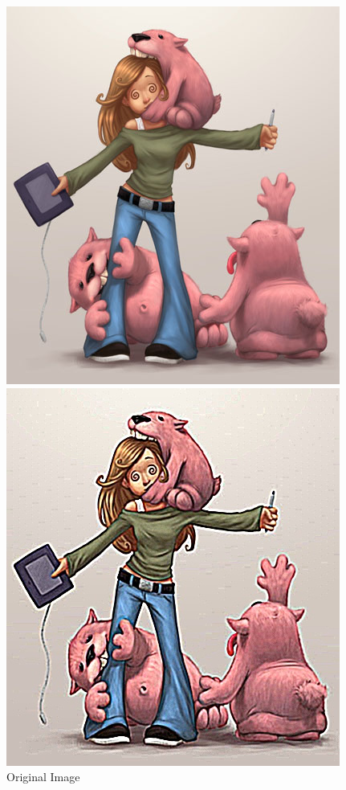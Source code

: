 \documentclass[10pt,twocolumn]{article}
\begin{document}
\begin{figure}
\centering
\begin{minipage}{0.15\textwidth}
\centering \includegraphics[width=\textwidth]{test2.jpg}
\caption{Original Image}
\end{minipage}
\begin{minipage}{0.15\textwidth}
\centering \includegraphics[width=\textwidth]{sharp10.jpg}

\end{minipage}
\end{figure}
\end{document}
